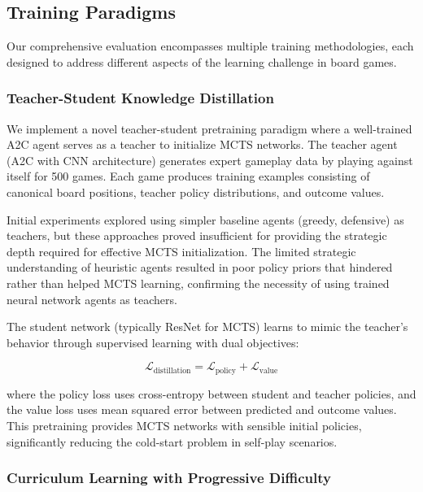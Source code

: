 \documentclass[conference]{IEEEtran}
\begin{document}
\subsection{Training Paradigms}

Our comprehensive evaluation encompasses multiple training methodologies, each designed to address different aspects of the learning challenge in board games.

\subsubsection{Teacher-Student Knowledge Distillation}

We implement a novel teacher-student pretraining paradigm where a well-trained A2C agent serves as a teacher to initialize MCTS networks. The teacher agent (A2C with CNN architecture) generates expert gameplay data by playing against itself for 500 games. Each game produces training examples consisting of canonical board positions, teacher policy distributions, and outcome values.

Initial experiments explored using simpler baseline agents (greedy, defensive) as teachers, but these approaches proved insufficient for providing the strategic depth required for effective MCTS initialization. The limited strategic understanding of heuristic agents resulted in poor policy priors that hindered rather than helped MCTS learning, confirming the necessity of using trained neural network agents as teachers.

The student network (typically ResNet for MCTS) learns to mimic the teacher's behavior through supervised learning with dual objectives:

\begin{equation}
\mathcal{L}_{\text{distillation}} = \mathcal{L}_{\text{policy}} + \mathcal{L}_{\text{value}}
\end{equation}

where the policy loss uses cross-entropy between student and teacher policies, and the value loss uses mean squared error between predicted and outcome values. This pretraining provides MCTS networks with sensible initial policies, significantly reducing the cold-start problem in self-play scenarios.

\subsubsection{Curriculum Learning with Progressive Difficulty}
\end{document}
